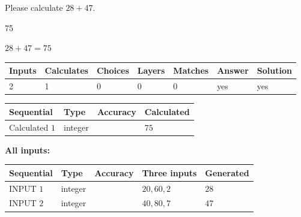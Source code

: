 \documentclass[12pt]{article}
\begin{document}
  
 
Please calculate $ %
28 +  %
47 $.
 
 
 
\noindent{}
 
 

75
 
 
\noindent{}
 
 

 
 
 
\noindent{}
 
 

$ %
28 +  %
47=   %
75$
 
 
\noindent{}
 
 

 
   
   
   
   
\noindent\begin{tabular}{|l|l|l|l|l|l|l|}
 \hline
Inputs & Calculates & Choices & Layers & Matches & Answer & Solution \\ \hline
 2  & 
 1  & 
 0
  & 
 0  & 
 0  & 
  yes & 
  yes 
  \\ \hline
 \end{tabular}
   
   
   
   
\noindent{}
   
   
  
  
\noindent\begin{tabular}{|l|l|l|l|}
\hline
 Sequential & Type & Accuracy & Calculated \\ 
\hline
 
 
  Calculated $  1 $ & integer &  & 
  $ 75 $ 
 \\  \hline  
 \end{tabular}
   
   
   
   
\noindent\vspace{0.1in}\hspace{-0.08in} {\textbf{\Large{All inputs: }}}
   
   
  
  
\noindent\begin{tabular}{|l|l|l|l|l|}
\hline
 Sequential & Type & Accuracy & Three inputs & Generated \\ 
\hline
 
 
  INPUT $  1 $ & integer &  & $
 20
 , 
 60
 , 
 2
 $ & $ 28 $ 
 \\  \hline  
 
 
  INPUT $  2 $ & integer &  & $
 40
 , 
 80
 , 
 7
 $ & $ 47 $ 
 \\  \hline  
 \end{tabular}
   
\end{document}
